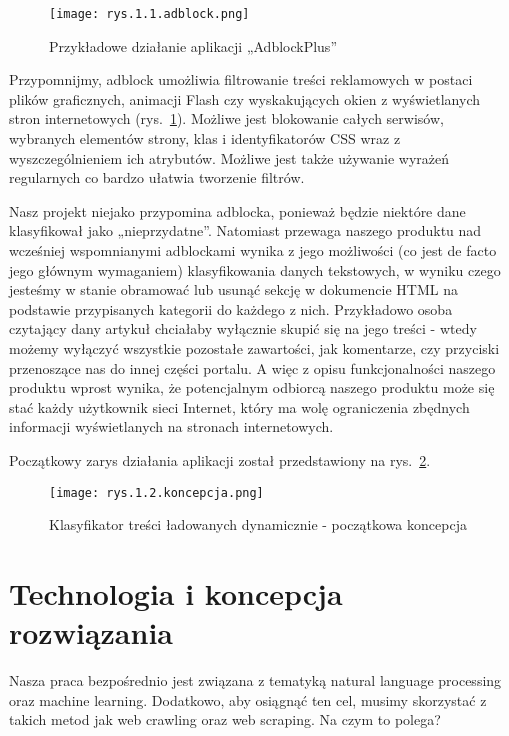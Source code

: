 \begin{figure}[h]
    \centering
    \texttt{[image: rys.1.1.adblock.png]}
    \caption{Przykładowe działanie aplikacji „AdblockPlus”}
    \label{fig:mesh1}
\end{figure}

Przypomnijmy, adblock umożliwia filtrowanie treści reklamowych w postaci plików graficznych, animacji Flash czy wyskakujących okien z wyświetlanych stron internetowych (rys.~\ref{fig:mesh1}). Możliwe jest blokowanie całych serwisów, wybranych elementów strony, klas i identyfikatorów CSS wraz z wyszczególnieniem ich atrybutów. Możliwe jest także używanie wyrażeń regularnych co bardzo ułatwia tworzenie filtrów.

Nasz projekt niejako przypomina adblocka, ponieważ będzie niektóre dane klasyfikował jako „nieprzydatne”. Natomiast przewaga naszego produktu nad wcześniej wspomnianymi adblockami wynika z jego możliwości (co jest de facto jego głównym wymaganiem) klasyfikowania danych tekstowych, w wyniku czego jesteśmy w stanie obramować lub usunąć sekcję w dokumencie HTML na podstawie przypisanych kategorii do każdego z nich. Przykładowo osoba czytający dany artykuł chciałaby wyłącznie skupić się na jego treści - wtedy możemy wyłączyć wszystkie pozostałe zawartości, jak komentarze, czy przyciski przenoszące nas do innej części portalu. A więc z opisu funkcjonalności naszego produktu wprost wynika, że potencjalnym odbiorcą naszego produktu może się stać każdy użytkownik sieci Internet, który ma wolę ograniczenia zbędnych informacji wyświetlanych na stronach internetowych.

Początkowy zarys działania aplikacji został przedstawiony na rys.~\ref{fig:mesh2}.

\begin{figure}[h]
    \centering
    \texttt{[image: rys.1.2.koncepcja.png]}
    \caption{Klasyfikator treści ładowanych dynamicznie - początkowa koncepcja}
    \label{fig:mesh2}
\end{figure}


\section{Technologia i koncepcja rozwiązania}
\label{sec:1.4.}

Nasza praca bezpośrednio jest związana z tematyką natural language processing oraz machine learning. Dodatkowo, aby osiągnąć ten cel, musimy skorzystać z takich metod jak web crawling oraz web scraping. Na czym to polega?

